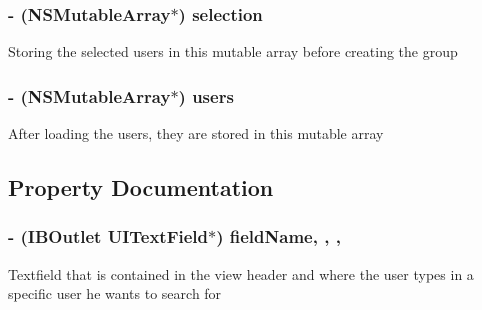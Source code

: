 \subsubsection[{selection}]{\setlength{\rightskip}{0pt plus 5cm}-\/ (N\+S\+Mutable\+Array$\ast$) selection\hspace{0.3cm}{\ttfamily [protected]}}\label{category_e_s_create_group_view_07_08_a753085d28703847d583393825fff377c}
Storing the selected users in this mutable array before creating the group \hypertarget{category_e_s_create_group_view_07_08_ab5b2d4b5e01d6ec9eb5c8ba47c0c7bde}{}
\subsubsection[{users}]{\setlength{\rightskip}{0pt plus 5cm}-\/ (N\+S\+Mutable\+Array$\ast$) users\hspace{0.3cm}{\ttfamily [protected]}}\label{category_e_s_create_group_view_07_08_ab5b2d4b5e01d6ec9eb5c8ba47c0c7bde}
After loading the users, they are stored in this mutable array 

\subsection{Property Documentation}
\hypertarget{category_e_s_create_group_view_07_08_a6d8453bf6a0d7db8c503400f60cbad6a}{}
\subsubsection[{field\+Name}]{\setlength{\rightskip}{0pt plus 5cm}-\/ (I\+B\+Outlet U\+I\+Text\+Field$\ast$) field\+Name\hspace{0.3cm}{\ttfamily [read]}, {\ttfamily [write]}, {\ttfamily [nonatomic]}, {\ttfamily [strong]}}\label{category_e_s_create_group_view_07_08_a6d8453bf6a0d7db8c503400f60cbad6a}
Textfield that is contained in the view header and where the user types in a specific user he wants to search for \hypertarget{category_e_s_create_group_view_07_08_aec7f8c0eb97bf847f327282bfed6fab1}{}
